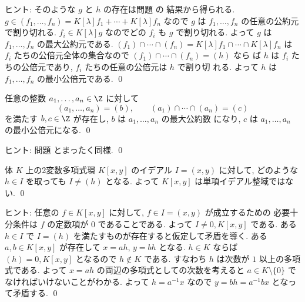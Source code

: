 \documentclass[12pt,twoside]{jarticle}
\begin{document}
\noindent
ヒント: そのような $g$ と $h$ の存在は問題  の
結果から得られる.  
$g\in (f_1,\dots,f_n)=K[\lambda]f_1+\cdots+K[\lambda]f_n$ なので $g$ 
は $f_1,\dots,f_n$ の任意の公約元で割り切れる.
$f_i\in K[\lambda]g$ なのでどの $f_i$ も $g$ で割り切れる. 
よって $g$ は $f_1,\dots,f_n$ の最大公約元である.
$(f_1)\cap\cdots\cap(f_n)=K[\lambda]f_1\cap\cdots\cap K[\lambda]f_n$ 
は $f_i$ たちの公倍元全体の集合なので $(f_1)\cap\cdots\cap(f_n) = (h)$ なら
ば $h$ は $f_i$ たちの公倍元であり, $f_i$ たちの任意の公倍元は $h$ で割り切
れる.  よって $h$ は $f_1,\dots,f_n$ の最小公倍元である.
\qed


\begin{question}
\label{q:gcd-lcm-Z}
  任意の整数 $a_1,\dots,a_n\in\Z$ に対して
  \begin{equation*}
    (a_1,\dots,a_n) = (b),
    \qquad
    (a_1)\cap\cdots\cap(a_n) = (c)
  \end{equation*}
  を満たす $b,c\in\Z$ が存在し, $b$ は $a_1,\dots,a_n$ の最大公約数
  になり, $c$ は $a_1,\dots,a_n$ の最小公倍元になる.
  \qed
\end{question}

\noindent
ヒント: 問題  とまったく同様.
\qed


\begin{question}
\label{q:K[x,y]-not-PID}
  体 $K$ 上の2変数多項式環 $K[x,y]$ のイデアル $I=(x,y)$ に対して,
  どのような $h\in I$ を取っても $I\ne (h)$ となる.
  よって $K[x,y]$ は単項イデアル整域ではない.
  \qed
\end{question}

\noindent
ヒント: 任意の $f\in K[x,y]$ に対して, $f\in I=(x,y)$ が成立するための
必要十分条件は $f$ の定数項が $0$ であることである.
よって $I\ne 0,K[x,y]$ である.
ある $h\in I$ で $I=(h)$ を満たすものが存在すると仮定して矛盾を導く.
ある $a,b\in K[x,y]$ が存在して $x=ah$, $y=bh$ となる.
$h\in K$ ならば $(h)=0,K[x,y]$ となるので $h\not\in K$ である.
すなわち $h$ は次数が $1$ 以上の多項式である.
よって $x=ah$ の両辺の多項式としての次数を考えると $a\in K\setminus\{0\}$ で
なければいけないことがわかる. 
よって $h = a^{-1}x$ なので $y=bh=a^{-1}bx$ となって矛盾する.
\qed
\end{document}

